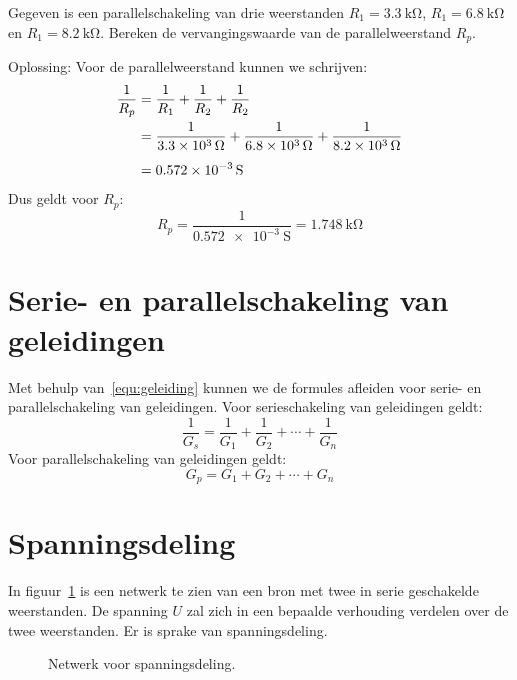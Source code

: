 \begin{example}
Gegeven is een parallelschakeling van drie weerstanden $R_1 = \SI{3.3}{\kilo\ohm}$,
$R_1 = \SI{6.8}{\kilo\ohm}$ en $R_1 = \SI{8.2}{\kilo\ohm}$. Bereken de vervangingswaarde
van de parallelweerstand $R_p$.

Oplossing: Voor de parallelweerstand kunnen we schrijven:
\begin{equation}
\begin{split}
\dfrac{1}{R_p} &= \dfrac{1}{R_1} + \dfrac{1}{R_2} + \dfrac{1}{R_2} \\
               &= \dfrac{1}{\SI{3.3d3}{\ohm}} + \dfrac{1}{\SI{6.8d3}{\ohm}} + \dfrac{1}{\SI{8.2d3}{\ohm}} \\[1ex]
               &= \SI{0,572e-3}{\siemens}
\end{split}
\end{equation}
%
Dus geldt voor $R_p$:
\begin{equation}
R_p = \dfrac{1}{\SI{0,572e-3}{\siemens}} = \SI{1,748}{\kilo\ohm}
\end{equation}
\end{example}

\section{Serie- en parallelschakeling van geleidingen}
Met behulp van~\eqref{equ:geleiding} kunnen we de formules afleiden voor serie- en parallelschakeling van geleidingen. Voor serieschakeling van geleidingen geldt:
%
\begin{equation}
\dfrac{1}{G_s} = \dfrac{1}{G_1} + \dfrac{1}{G_2} + \cdots + \dfrac{1}{G_n}
\end{equation}
%
Voor parallelschakeling van geleidingen geldt:
%
\begin{equation}
G_p = G_1 + G_2 + \cdots + G_n
\end{equation}


\section{Spanningsdeling}
In figuur~\ref{fig:gelspanningsdeling} is een netwerk te zien van een bron met twee in
serie geschakelde weerstanden. De spanning $U$ zal zich in een bepaalde verhouding
verdelen over de twee weerstanden. Er is sprake van spanningsdeling.

\begin{figure}[!ht]
\centering
{}
\caption{Netwerk voor spanningsdeling.}
\label{fig:gelspanningsdeling}
\end{figure}

